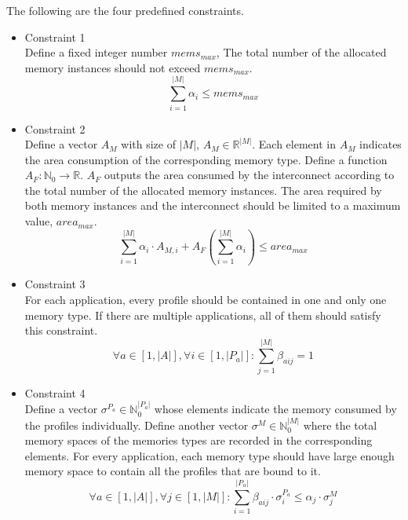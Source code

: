 	The following are the four predefined constraints.
	
	\begin{itemize}
		\item Constraint 1 \\
			Define a fixed integer number $mems_{max}$, 
			The total number of the allocated memory instances
			should not exceed $mems_{max}$.
			\begin{equation}
			\label{equa:constraint_1}
				\sum_{i=1}^{\lvert M \rvert} \alpha_{i}
				\leq mems_{max}
			\end{equation}
		\item Constraint 2 \\
			Define a vector $A_{M}$ with size of $\lvert M \lvert$,
			$A_{M} \in \mathbb{R}^{\lvert M \lvert}$. Each element in
			$A_{M}$ indicates the area consumption of the corresponding
			memory type.
			Define a function $A_{F} \colon \mathbb{N}_{0}
			\rightarrow \mathbb{R}$. $A_{F}$ outputs the area consumed
			by the interconnect according to the total number of the allocated
			memory instances.
			The area required by both memory instances and the interconnect
			should be limited to a maximum value, $area_{max}$.
			\begin{equation}
			\label{equa:constraint_2}
				\sum_{i=1}^{\lvert M \rvert} \alpha_{i} \cdot A_{M,i}
				+ A_{F} ( \sum_{i=1}^{\lvert M \rvert} \alpha_{i} ) 
				\leq area_{max}
			\end{equation}			
		\item Constraint 3 \\
			For each application, every profile should be contained in one
			and only one memory type. If there are multiple applications, all
			of them should satisfy this constraint.
			\begin{equation}
			\label{equa:constraint_3}
				\forall a \in \left[ 1, \lvert A \rvert \right], 
				\forall i \in \left[ 1, \lvert P_a \rvert \right] \colon
				\sum_{j=1}^{\lvert M \rvert} \beta_{aij} = 1
			\end{equation}		
		\item Constraint 4 \\
			Define a vector
			$\sigma^{P_{a}} \in \mathbb{N}_{0}^{\lvert P_{a} \rvert} $
			whose elements indicate the memory consumed by the profiles
			individually.
			Define another vector
			$\sigma^{M} \in \mathbb{N}_{0}^{\lvert M \rvert}$
			where the total memory spaces of the memories types are
			recorded in the corresponding elements.
			For every application, each memory type should have large enough 
			memory space to contain all the profiles that are bound to it.
			\begin{equation}
			\label{equa:constraint_4}
				\forall a \in \left[ 1, \lvert A \rvert \right], 
				\forall j \in \left[ 1, \lvert M \rvert \right] \colon
				\sum_{i=1}^{\lvert P_{a} \rvert} \beta_{aij} \cdot
				\sigma_{i}^{P_{a}} \leq \alpha_{j} \cdot \sigma_{j}^{M}
			\end{equation}
	\end{itemize}


